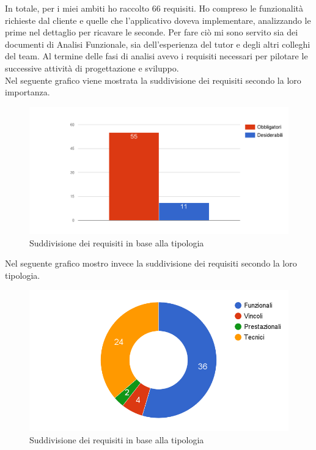 	In totale, per i miei ambiti ho raccolto 66 requisiti. Ho compreso le funzionalità richieste dal cliente e quelle che l'applicativo doveva implementare, analizzando le prime nel dettaglio per ricavare le seconde. Per fare ciò mi sono servito sia dei documenti di Analisi Funzionale, sia dell'esperienza del tutor e degli altri colleghi del team. Al termine delle fasi di analisi avevo i requisiti necessari per pilotare le successive attività di progettazione e sviluppo.\\
	
	Nel seguente grafico viene mostrata la suddivisione dei requisiti secondo la loro importanza.
	
	\begin{figure}[H]
		\centering
	   	\includegraphics[width=1\textwidth]{immagini/suddivisione_requisiti2}
	   	\caption{Suddivisione dei requisiti in base alla tipologia}
	\end{figure}
	
	Nel seguente grafico mostro invece la suddivisione dei requisiti secondo la loro tipologia.
	
	\begin{figure}[H]
		\centering
	   	\includegraphics[width=1\textwidth]{immagini/suddivisione_requisiti}
	   	\caption{Suddivisione dei requisiti in base alla tipologia}
	\end{figure}

